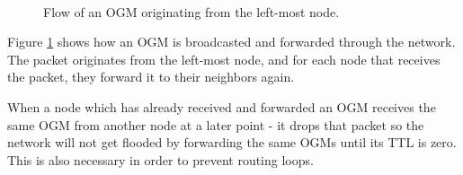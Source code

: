 \begin{figure}[h]
	\centering
	\\
	\caption{Flow of an \acf{OGM} originating from the left-most node.}
	\label{fig:ogm_packet_flow}
\end{figure}

Figure \ref{fig:ogm_packet_flow} shows how an \ac{OGM} is broadcasted and
forwarded through the network. The packet originates from the left-most node,
and for each node that receives the packet, they forward it to their neighbors
again.

When a node which has already received and forwarded an \ac{OGM} receives the
same \ac{OGM} from another node at a later point - it drops that packet so the
network will not get flooded by forwarding the same \acp{OGM} until its \ac{TTL}
is zero. This is also necessary in order to prevent routing loops.


